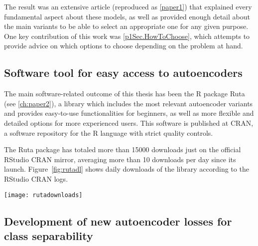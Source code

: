 The result was an extensive article (reproduced as \autoref{paper1}) that explained every fundamental aspect about these models, as well as provided enough detail about the main variants to be able to select an appropriate one for any given purpose. One key contribution of this work was \autoref{p1Sec.HowToChoose}, which attempts to provide advice on which options to choose depending on the problem at hand.

\subsection{Software tool for easy access to autoencoders}


The main software-related outcome of this thesis has been the R package Ruta (see \autoref{ch:paper2}), a library which includes the most relevant autoencoder variants and provides easy-to-use functionalities for beginners, as well as more flexible and detailed options for more experienced users. This software is published at CRAN, a software repository for the R language with strict quality controls.

The Ruta package has totaled more than 15000 downloads just on the official RStudio CRAN mirror, averaging more than 10 downloads per day since its launch. Figure~\ref{fig:rutadl} shows daily downloads of the library according to the RStudio CRAN logs.

\begin{figure*}[htbp]
    \texttt{[image: rutadownloads]}
    \caption{\label{fig:rutadl}Per-day downloads of the Ruta package from the RStudio CRAN mirror.}
\end{figure*}

\subsection{Development of new autoencoder losses for class separability}



